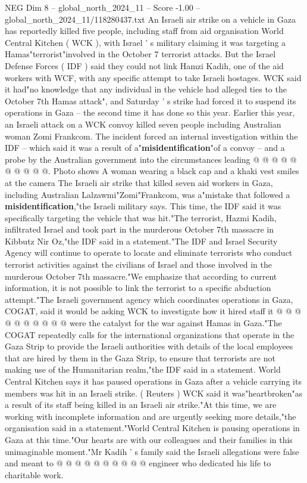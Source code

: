 \begin{textsample}{NEG Dim 8 – global\_north\_2024\_11 – Score -1.00 – global\_north\_2024\_11/118280437.txt}  \label{ex:f8_neg_389}
An Israeli air strike on a vehicle in Gaza has reportedly killed five people, including staff from aid organisation World Central Kitchen ( WCK ), with Israel ' s military claiming it was targeting a Hamas"terrorist"involved in the October 7 terrorist attacks.
But the Israel Defense Forces ( IDF ) said they could not link Hamzi Kadih, one of the aid workers with WCF, with any specific attempt to take Israeli hostages.
WCK said it had"no knowledge that any individual in the vehicle had alleged ties to the October 7th Hamas attack", and Saturday ' s strike had forced it to suspend its operations in Gaza -- the second time it has done so this year.
Earlier this year, an Israeli attack on a WCK convoy killed seven people including Australian woman Zomi Frankcom.
The incident forced an internal investigation within the IDF -- which said it was a result of a"\textbf{misidentification}"of a convoy -- and a probe by the Australian government into the circumstances leading @ @ @ @ @ @ @ @ @ @.
Photo shows A woman wearing a black cap and a khaki vest smiles at the camera The Israeli air strike that killed seven aid workers in Gaza, including Australian Lalzawmi"Zomi"Frankcom, was a"mistake that followed a \textbf{misidentification},"the Israeli military says.
This time, the IDF said it was specifically targeting the vehicle that was hit."The terrorist, Hazmi Kadih, infiltrated Israel and took part in the murderous October 7th massacre in Kibbutz Nir Oz,"the IDF said in a statement."The IDF and Israel Security Agency will continue to operate to locate and eliminate terrorists who conduct terrorist activities against the civilians of Israel and those involved in the murderous October 7th massacre."We emphasize that according to current information, it is not possible to link the terrorist to a specific abduction attempt."The Israeli government agency which coordinates operations in Gaza, COGAT, said it would be asking WCK to investigate how it hired staff it @ @ @ @ @ @ @ @ @ @ were the catalyst for the war against Hamas in Gaza."The COGAT repeatedly calls for the international organizations that operate in the Gaza Strip to provide the Israeli authorities with details of the local employees that are hired by them in the Gaza Strip, to ensure that terrorists are not making use of the Humanitarian realm,"the IDF said in a statement.
World Central Kitchen says it has paused operations in Gaza after a vehicle carrying its members was hit in an Israeli strike. ( Reuters ) WCK said it was"heartbroken"as a result of its staff being killed in an Israeli air strike."At this time, we are working with incomplete information and are urgently seeking more details,"the organisation said in a statement."World Central Kitchen is pausing operations in Gaza at this time."Our hearts are with our colleagues and their families in this unimaginable moment."Mr Kadih ' s family said the Israeli allegations were false and meant to @ @ @ @ @ @ @ @ @ @ engineer who dedicated his life to charitable work.

\end{textsample}
